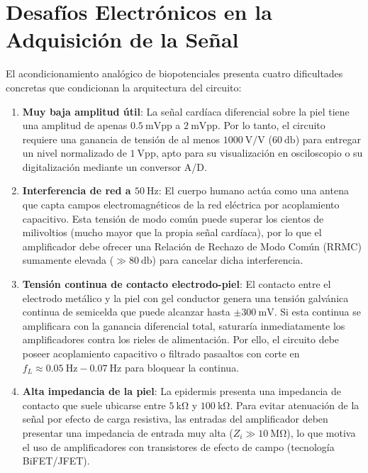 \section{Desafíos Electrónicos en la Adquisición de la Señal}

El acondicionamiento analógico de biopotenciales presenta cuatro dificultades concretas que condicionan la arquitectura del circuito:
\begin{enumerate}
  \item \textbf{Muy baja amplitud útil}: La señal cardíaca diferencial sobre la piel tiene una amplitud de apenas $\SI{0.5}{\milli\volt\text{pp}}$ a $\SI{2}{\milli\volt\text{pp}}$. Por lo tanto, el circuito requiere una ganancia de tensión de al menos $1000\ \text{V/V}$ ($\SI{60}{\decibel}$) para entregar un nivel normalizado de $\SI{1}{\volt\text{pp}}$, apto para su visualización en osciloscopio o su digitalización mediante un conversor A/D.
  \item \textbf{Interferencia de red a $\SI{50}{\hertz}$}: El cuerpo humano actúa como una antena que capta campos electromagnéticos de la red eléctrica por acoplamiento capacitivo. Esta tensión de modo común puede superar los cientos de milivoltios (mucho mayor que la propia señal cardíaca), por lo que el amplificador debe ofrecer una Relación de Rechazo de Modo Común (RRMC) sumamente elevada ($\gg \SI{80}{\decibel}$) para cancelar dicha interferencia.
  \item \textbf{Tensión continua de contacto electrodo-piel}: El contacto entre el electrodo metálico y la piel con gel conductor genera una tensión galvánica continua de semicelda que puede alcanzar hasta $\pm \SI{300}{\milli\volt}$. Si esta continua se amplificara con la ganancia diferencial total, saturaría inmediatamente los amplificadores contra los rieles de alimentación. Por ello, el circuito debe poseer acoplamiento capacitivo o filtrado pasaaltos con corte en $f_L \approx \SI{0.05}{\hertz} - \SI{0.07}{\hertz}$ para bloquear la continua.
  \item \textbf{Alta impedancia de la piel}: La epidermis presenta una
      impedancia de contacto que suele ubicarse entre $\SI{5}{\kilo\ohm}$ y
        $\SI{100}{\kilo\ohm}$. Para evitar atenuación de la señal por efecto de
        carga resistiva, las entradas del amplificador deben presentar una
        impedancia de entrada muy alta ($Z_i \gg \SI{10}{\mega\ohm}$), lo que
        motiva el uso de amplificadores con transistores de efecto de campo
        (tecnología BiFET/JFET).
\end{enumerate}

